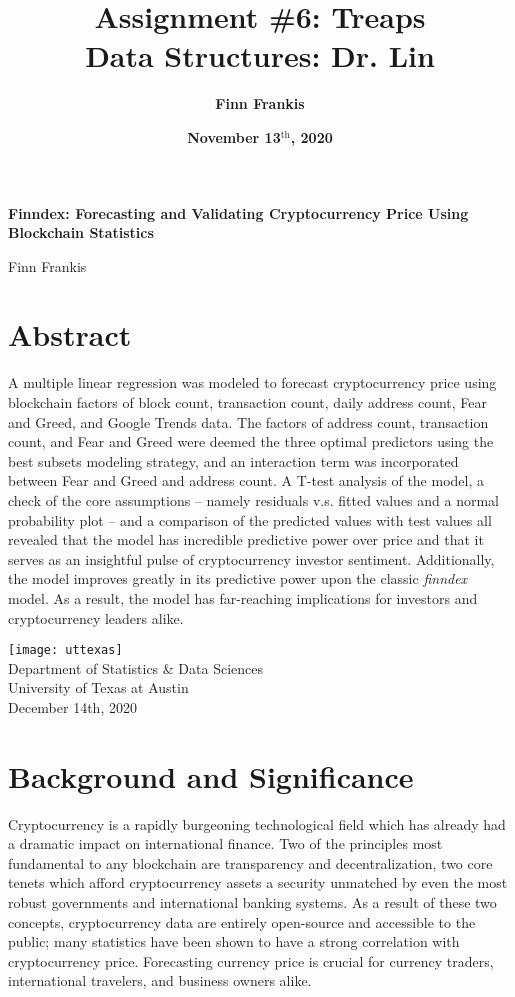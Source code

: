 \documentclass{article}
\title{\Large \textbf{Assignment \#6: Treaps} \\\vspace{0.2em} \large \textbf{Data Structures: Dr. Lin} \vspace{-1em}}
\author{ \textbf{Finn Frankis}}
\date{\vspace{-0.7em}\textbf{November 13$^\text{th}$, 2020}}
\begin{document}
\begin{titlepage}
    \begin{center}
            
        \LARGE
        \textbf{Finndex: Forecasting and Validating Cryptocurrency Price Using Blockchain Statistics}
            
        \vspace{0.5cm}
            
        Finn Frankis
            
            
        \vspace{0.4cm}
            
            
    \end{center}
    \section*{Abstract}
A multiple linear regression was modeled to forecast cryptocurrency price using blockchain factors of block count, transaction count, daily address count, Fear and Greed, and Google Trends data. The factors of address count, transaction count, and Fear and Greed were deemed the three optimal predictors using the best subsets modeling strategy, and an interaction term was incorporated between Fear and Greed and address count. A T-test analysis of the model, a check of the core assumptions -- namely residuals v.s. fitted values and a normal probability plot -- and a comparison of the predicted values with test values all revealed that the model has incredible predictive power over price and that it serves as an insightful pulse of cryptocurrency investor sentiment. Additionally, the model improves greatly in its predictive power upon the classic \textit{finndex} model. As a result, the model has far-reaching implications for investors and cryptocurrency leaders alike.
\vfill
\Large
\begin{center}
  \texttt{[image: uttexas]} \\
Department of Statistics \& Data Sciences \\
University of Texas at Austin\\
December 14th, 2020
\end{center}
\end{titlepage}
\section{Background and Significance}
Cryptocurrency is a rapidly burgeoning technological field which has already had a dramatic impact on international finance. Two of the principles most fundamental to any blockchain are transparency and decentralization, two core tenets which afford cryptocurrency assets a security unmatched by even the most robust governments and international banking systems. As a result of these two concepts, cryptocurrency data are entirely open-source and accessible to the public; many statistics have been shown to have a strong correlation with cryptocurrency price. Forecasting currency price is crucial for currency traders, international travelers, and business owners alike.
\end{document}
